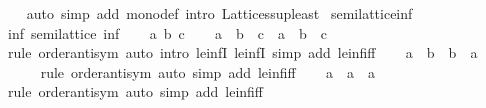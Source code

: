 \begin{isabellebody}
%
\isadelimproof
\ \ %
\endisadelimproof
%
\isatagproof
{}\isamarkupfalse%
\ {\isacharparenleft}{\kern0pt}auto\ simp\ add{\isacharcolon}{\kern0pt}\ mono{\isacharunderscore}{\kern0pt}def\ intro{\isacharcolon}{\kern0pt}\ Lattices{\isachardot}{\kern0pt}sup{\isacharunderscore}{\kern0pt}least{\isacharparenright}{\kern0pt}%
\endisatagproof
{\isafoldproof}%
%
\isadelimproof
\isanewline
%
\endisadelimproof
\isanewline
{}\isamarkupfalse%
%
\isadelimdocument
%
\endisadelimdocument
%
\isatagdocument
%
\isamarkuptrue%
%
\endisatagdocument
{\isafolddocument}%
%
\isadelimdocument
%
\endisadelimdocument
{}\isamarkupfalse%
\ semilattice{\isacharunderscore}{\kern0pt}inf\isanewline
{}\isanewline
\isanewline
{}\isamarkupfalse%
\ inf{\isacharcolon}{\kern0pt}\ semilattice\ inf\isanewline
%
\isadelimproof
%
\endisadelimproof
%
\isatagproof
{}\isamarkupfalse%
\isanewline
\ \ \isamarkupfalse%
\ a\ b\ c\isanewline
\ \ \isamarkupfalse%
\ {\isachardoublequoteopen}{\isacharparenleft}{\kern0pt}a\ {\isasymsqinter}\ b{\isacharparenright}{\kern0pt}\ {\isasymsqinter}\ c\ {\isacharequal}{\kern0pt}\ a\ {\isasymsqinter}\ {\isacharparenleft}{\kern0pt}b\ {\isasymsqinter}\ c{\isacharparenright}{\kern0pt}{\isachardoublequoteclose}\isanewline
\ \ \ \ \isamarkupfalse%
\ {\isacharparenleft}{\kern0pt}rule\ order{\isachardot}{\kern0pt}antisym{\isacharparenright}{\kern0pt}\ {\isacharparenleft}{\kern0pt}auto\ intro{\isacharcolon}{\kern0pt}\ le{\isacharunderscore}{\kern0pt}infI{}\ le{\isacharunderscore}{\kern0pt}infI{}\ simp\ add{\isacharcolon}{\kern0pt}\ le{\isacharunderscore}{\kern0pt}inf{\isacharunderscore}{\kern0pt}iff{\isacharparenright}{\kern0pt}\isanewline
\ \ \isamarkupfalse%
\ {\isachardoublequoteopen}a\ {\isasymsqinter}\ b\ {\isacharequal}{\kern0pt}\ b\ {\isasymsqinter}\ a{\isachardoublequoteclose}\isanewline
\ \ \ \ \isamarkupfalse%
\ {\isacharparenleft}{\kern0pt}rule\ order{\isachardot}{\kern0pt}antisym{\isacharparenright}{\kern0pt}\ {\isacharparenleft}{\kern0pt}auto\ simp\ add{\isacharcolon}{\kern0pt}\ le{\isacharunderscore}{\kern0pt}inf{\isacharunderscore}{\kern0pt}iff{\isacharparenright}{\kern0pt}\isanewline
\ \ \isamarkupfalse%
\ {\isachardoublequoteopen}a\ {\isasymsqinter}\ a\ {\isacharequal}{\kern0pt}\ a{\isachardoublequoteclose}\isanewline
\ \ \ \ \isamarkupfalse%
\ {\isacharparenleft}{\kern0pt}rule\ order{\isachardot}{\kern0pt}antisym{\isacharparenright}{\kern0pt}\ {\isacharparenleft}{\kern0pt}auto\ simp\ add{\isacharcolon}{\kern0pt}\ le{\isacharunderscore}{\kern0pt}inf{\isacharunderscore}{\kern0pt}iff{\isacharparenright}{\kern0pt}\isanewline

\end{isabellebody}
